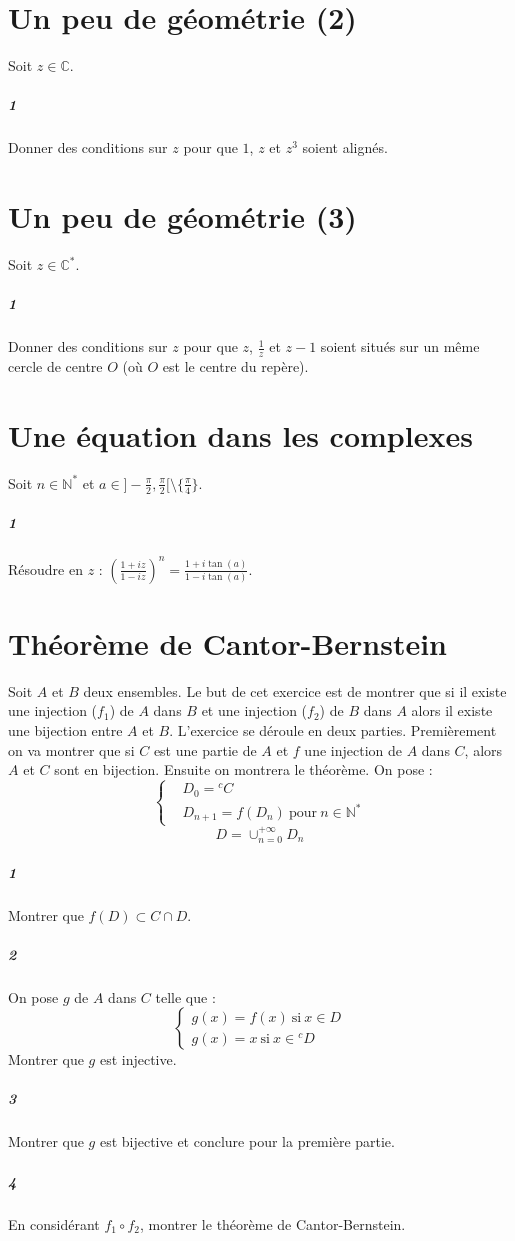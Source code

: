 \documentclass[10pt,a4paper]{article}
\begin{document}
\section{Un peu de géométrie (2)}
Soit $z \in \mathbb{C}$.
\subparagraph{1}Donner des conditions sur $z$ pour que $1$, $z$ et $z^3$ soient alignés.

\section{Un peu de géométrie (3)}
Soit $z \in \mathbb{C}^{*}$.
\subparagraph{1}Donner des conditions sur $z$ pour que $z$, $\frac{1}{z}$ et $z-1$ soient situés sur un même cercle de centre $O$ (où $O$ est le centre du repère).

\section{Une équation dans les complexes}
Soit $n \in \mathbb{N}^*$ et $a \in ]-\frac{\pi}{2},\frac{\pi}{2}[ \setminus \{ \frac{\pi}{4}\}$.
\subparagraph{1}Résoudre en $z$ : $\left(\frac{1+iz}{1-iz}\right)^n=\frac{1+i\tan(a)}{1-i\tan(a)}$.

\section{Théorème de Cantor-Bernstein}
Soit $A$ et $B$ deux ensembles. Le but de cet exercice est de montrer que si il existe une injection ($f_1$) de $A$ dans $B$ et une injection ($f_2$) de $B$ dans $A$ alors il existe une bijection entre $A$ et $B$. L'exercice se déroule en deux parties. Premièrement on va montrer que si $C$ est une partie de $A$ et $f$ une injection de $A$ dans $C$, alors $A$ et $C$ sont en bijection. Ensuite on montrera le théorème. On pose :
\begin{equation*}
\left\{
\begin{aligned}
&D_0={}^c C \\
&D_{n+1}=f(D_n) \ \text{pour} \ n \in \mathbb{N}^{*}
\end{aligned}\right.
\end{equation*}
\begin{equation*}
D=\cup_{n=0}^{+\infty} D_n
\end{equation*}
\subparagraph{1}Montrer que $f(D) \subset C \cap D$.
\subparagraph{2}On pose $g$ de $A$ dans $C$ telle que :
\begin{equation*}
\left\{
\begin{aligned}
g(x)=f(x) \ \text{si} \ x \in D \\
g(x)=x \ \text{si} \ x \in {}^cD
\end{aligned}\right.
\end{equation*}
Montrer que $g$ est injective.
\subparagraph{3}Montrer que $g$ est bijective et conclure pour la première partie.
\subparagraph{4}En considérant $f_1 \circ f_2$, montrer le théorème de Cantor-Bernstein.
\end{document}
